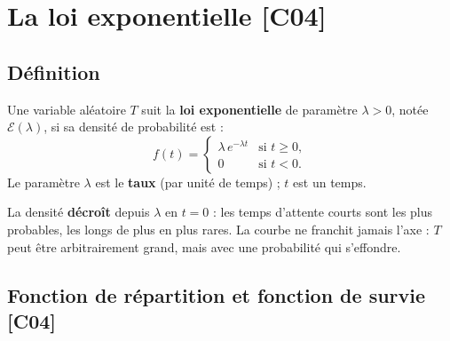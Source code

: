 \documentclass[a4paper,11pt]{article}
\begin{document}
\newpage
\section{La loi exponentielle \hfill {\normalsize\color{uimmred}[C04]}}

\subsection{Définition}

\begin{definition}
Une variable aléatoire $T$ suit la \textbf{loi exponentielle} de paramètre $\lambda > 0$, notée $\mathcal{E}(\lambda)$, si sa densité de probabilité est :
\[
f(t) = \begin{cases} \lambda\, e^{-\lambda t} & \text{si } t \geq 0, \\[2pt] 0 & \text{si } t < 0. \end{cases}
\]
Le paramètre $\lambda$ est le \textbf{taux} (par unité de temps) ; $t$ est un temps.
\end{definition}

\begin{center}
\end{center}

\begin{remarque}
La densité \textbf{décroît} depuis $\lambda$ en $t=0$ : les temps d'attente courts sont les plus probables, les longs de plus en plus rares. La courbe ne franchit jamais l'axe : $T$ peut être arbitrairement grand, mais avec une probabilité qui s'effondre.
\end{remarque}

\subsection{Fonction de répartition et fonction de survie \hfill {\normalsize\color{uimmred}[C04]}}
\end{document}
